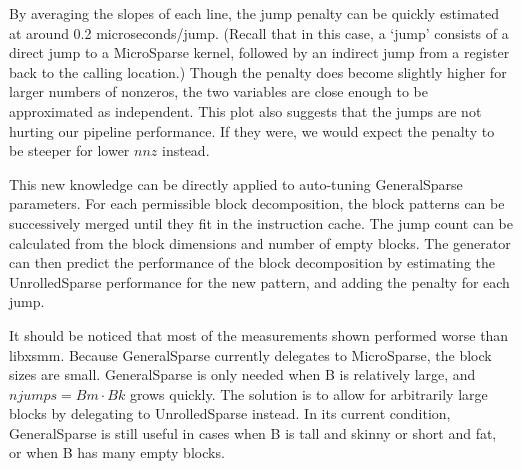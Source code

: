 By averaging the slopes of each line, the jump penalty can be quickly estimated at around 0.2 microseconds/jump. (Recall that in this case, a `jump' consists of a direct jump to a MicroSparse kernel, followed by an indirect jump from a register back to the calling location.) Though the penalty does become slightly higher for larger numbers of nonzeros, the two variables are close enough to be approximated as independent. This plot also suggests that the jumps are not hurting our pipeline performance. If they were, we would expect the penalty to be steeper for lower $nnz$ instead. 

This new knowledge can be directly applied to auto-tuning GeneralSparse parameters. For each permissible block decomposition, the block patterns can be successively merged until they fit in the instruction cache. The jump count can be calculated from the block dimensions and number of empty blocks. The generator can then predict the performance of the block decomposition by estimating the UnrolledSparse performance for the new pattern, and adding the penalty for each jump.

It should be noticed that most of the measurements shown performed worse than libxsmm. Because GeneralSparse currently delegates to MicroSparse, the block sizes are small. GeneralSparse is only needed when B is relatively large, and $njumps = Bm \cdot Bk$ grows quickly. The solution is to allow for arbitrarily large blocks by delegating to UnrolledSparse instead. In its current condition, GeneralSparse is still useful in cases when B is tall and skinny or short and fat, or when B has many empty blocks. 







